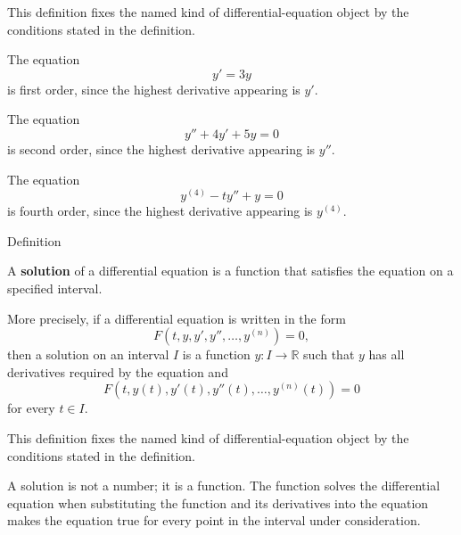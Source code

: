 \begin{remark*}
This definition fixes the named kind of differential-equation object by the
conditions stated in the definition.
\end{remark*}

\NoLocalDependencies

\begin{example*}
The equation
\[
y'=3y
\]
is first order, since the highest derivative appearing is $y'$.

The equation
\[
y''+4y'+5y=0
\]
is second order, since the highest derivative appearing is $y''$.

The equation
\[
y^{(4)}-t y''+y=0
\]
is fourth order, since the highest derivative appearing is $y^{(4)}$.
\end{example*}


\begin{definitionbox}{Definition}
\begin{definition}
\label{def:ordinary-differential-equations-terminology-solution-of-a-differential-equation}
A \textbf{solution} of a differential equation is a function that satisfies the equation on a specified interval.

More precisely, if a differential equation is written in the form
\[
F(t,y,y',y'',\dots,y^{(n)})=0,
\]
then a solution on an interval $I$ is a function $y:I\to\mathbb{R}$ such that $y$ has all derivatives required by the equation and
\[
F(t,y(t),y'(t),y''(t),\dots,y^{(n)}(t))=0
\]
for every $t\in I$.
\end{definition}
\end{definitionbox}

\begin{remark*}
This definition fixes the named kind of differential-equation object by the
conditions stated in the definition.
\end{remark*}

\NoLocalDependencies

\begin{remark*}[Interpretation]
A solution is not a number; it is a function. The function solves the differential equation when substituting the function and its derivatives into the equation makes the equation true for every point in the interval under consideration.
\end{remark*}

